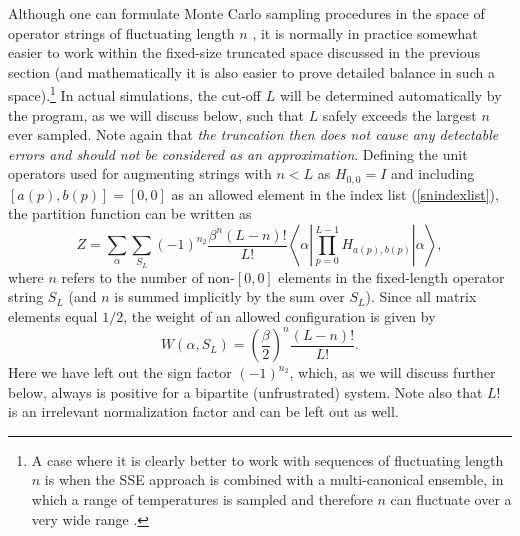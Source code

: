 \documentclass[draft,numberedheadings]{aipproc}
\begin{document}
Although one can formulate Monte Carlo sampling procedures in the space of operator strings of fluctuating length $n$ \cite{handscomb62,sandvik92,trebst07}, 
it is normally in practice somewhat easier to work within the fixed-size truncated space discussed in the previous section (and mathematically it is also easier 
to prove detailed balance in such a space).\footnote{A case where it is clearly better to work with sequences of fluctuating length $n$ is when the SSE approach 
is combined with a multi-canonical ensemble, in which a range of temperatures is sampled and therefore $n$ can fluctuate over a very wide range \cite{trebst07}.} 
In actual simulations, the cut-off $L$ will be determined automatically by the program, as we will discuss below, such that $L$ safely exceeds the largest $n$ ever 
sampled. Note again that {\it the truncation then does not cause any detectable errors and should not be considered as an approximation}. Defining the unit operators 
used for augmenting strings with $n<L$ as $H_{0,0}=I$ and including $[a(p),b(p)]=[0,0]$ as an allowed element in the index list (\ref{snindexlist}), the partition 
function can be written as
\begin{equation}
Z=\sum_{\alpha}\sum_{S_L}(-1)^{n_2}\frac{\beta^n(L-n)!}{L!}\left \langle \alpha \left | \prod_{p=0}^{L-1} H_{a(p),b(p)} \right |\alpha \right \rangle ,
\label{zsseheis2}
\end{equation}
where $n$ refers to the number of non-$[0,0]$ elements in the fixed-length operator string $S_L$ (and $n$ is summed implicitly by the sum over $S_L$). 
Since all matrix elements equal $1/2$, the weight of an allowed configuration is given by
\begin{equation}
W(\alpha,S_L)=\left ( \frac{\beta}{2}\right )^n\frac{(L-n)!}{L!}.
\label{wsseheis1}
\end{equation}
Here we have left out the sign factor $(-1)^{n_2}$, which, as we will discuss further below, always is positive for a bipartite (unfrustrated) system.
Note also that $L!$ is an irrelevant normalization factor and can be left out as well.
\end{document}
